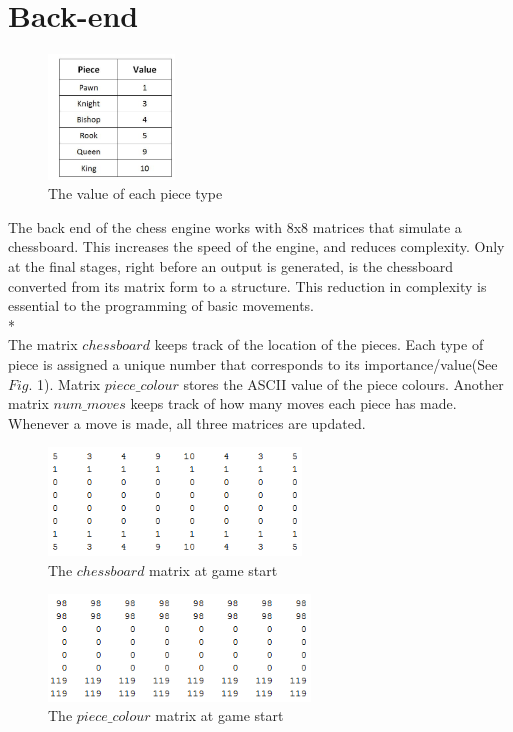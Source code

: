 \documentclass[11pt,a4paper]{article}
\begin{document}
\section{Back-end}

\begin{figure}
\includegraphics[width=0.3\textwidth]{piece_value}
\caption{The value of each piece type}
\label{fig:chess1}
\end{figure}

\indent\indent  The back end of the chess engine works with 8x8 matrices that simulate a chessboard. This increases the speed of the engine, and reduces complexity. Only at the final stages, right before an output is generated, is the chessboard converted from its matrix form to a structure. This reduction in complexity is essential to the programming of basic movements.
\\*\\
\indent The matrix $chessboard$ keeps track of the location of the pieces. Each type of piece is assigned a unique number that corresponds to its importance/value(See $Fig.$ 1). Matrix $piece\_colour$ stores the ASCII value of the piece colours. Another matrix $num\_moves$ keeps track of how many moves each piece has made. Whenever a move is made, all three matrices are updated.
\newline


\begin{figure}[H]
\centering
\includegraphics[width=0.6\textwidth]{chessboardmatrix}
\caption{The $chessboard$ matrix at game start}
\label{fig:chess1}
\end{figure}

\begin{figure}[H]
\centering
\includegraphics[width=0.62\textwidth]{piece_colour}
\caption{The $piece\_colour$ matrix at game start}
\label{fig:chess2}
\end{figure}
\end{document}
